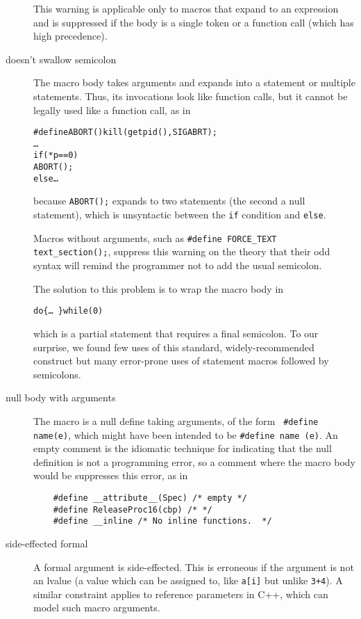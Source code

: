 \documentclass[10pt]{article}
\begin{document}
\begin{description}
        This warning is applicable only to macros that expand to an
        expression and is suppressed if the body is a single token or a
        function call (which has high precedence).

\item[doesn't swallow semicolon]\label{item:swallow-semicolon}
        The macro body takes arguments and expands into a statement or
        multiple statements.  Thus, its invocations look like function
        calls, but it cannot be legally used like a function call, as in
\begin{alltt}
    #define ABORT() kill(getpid(),SIGABRT);
    \ldots
    if (*p == 0)
      ABORT();
    else \ldots
\end{alltt}
        because {\tt ABORT();} expands to two statements (the second a null
        statement), which is unsyntactic between the {\tt if} condition and
        {\tt else}.

        Macros without arguments, such as {\tt \#define \verb|FORCE_TEXT|
        \verb|text_section|();}, suppress this warning on the theory that their
        odd syntax will remind the programmer not to add the usual semicolon.

        The solution to this problem is to wrap the macro body in
\begin{alltt}
             do \verb|{| \ldots\ \verb|}| while (0)
\end{alltt}
        which is a partial statement that requires a final semicolon.  To
        our surprise, we found few uses of this standard, widely-recommended
        construct but many error-prone uses of statement macros followed by
        semicolons.

\item[null body with arguments]
        The macro is a null define taking arguments, of the form {\tt
        \#define name(e)},
        which might have been intended to be {\tt \#define name (e)}.
        An empty comment is the idiomatic technique for indicating that the
        null definition is not a programming error, so a comment where the macro
        body would be suppresses this error, as in
\begin{verbatim}
    #define __attribute__(Spec) /* empty */
    #define ReleaseProc16(cbp) /* */
    #define __inline /* No inline functions.  */
\end{verbatim}

\item[side-effected formal]
        A formal argument is side-effected.  This is erroneous if the
        argument is not an lvalue (a value which can be assigned to, like
        {\tt a[i]} but unlike {\tt 3+4}).  A similar constraint applies to
        reference parameters in C++, which can model such macro arguments.


\end{description}
\end{document}
